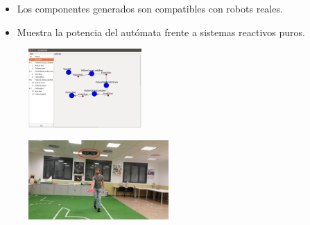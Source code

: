 \documentclass[notes,slidesec,a4]{seminar}
\begin{document}
\begin{hslide}

\begin{itemize}
\item Los componentes generados son compatibles con robots reales.
\item Muestra la potencia del autómata frente a sistemas reactivos puros.
\end{itemize}

\begin{center}
\begin{minipage}[t]{0.45\textwidth}
	\begin{figure}
		\includegraphics[height=3cm]{imgs/colorsDiagram.png}
	\end{figure}
\end{minipage}
\begin{minipage}[t]{0.45\textwidth}
	\begin{figure}
		\includegraphics[height=3cm]{imgs/followingRed.jpg}
	\end{figure}
\end{minipage}
\end{center}

\end{hslide}

\end{document}
